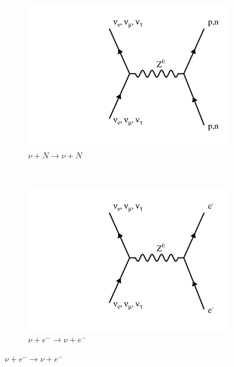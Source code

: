 \begin{figure}
\begin{center}
  \vspace{20pt}
  \begin{subfigure}[b]{0.45\textwidth}
    \centering
    \includegraphics[width=\textwidth]{figures/feynman/ncHad.pdf}
    \caption*{$\nu + N \rightarrow \nu + N$}
  \end{subfigure}
  ~
  \begin{subfigure}[b]{0.45\textwidth}
    \centering
    \includegraphics[width=\textwidth]{figures/feynman/ncElec.pdf}
    \caption*{$\nu + e^- \rightarrow \nu + e^-$}
  \end{subfigure}


\end{center}
\end{figure}
